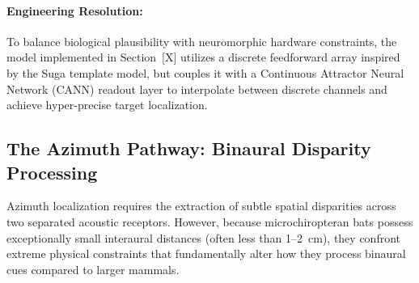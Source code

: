 \paragraph{Engineering Resolution:} To balance biological plausibility with neuromorphic hardware constraints, the model implemented in Section~[X] utilizes a discrete feedforward array inspired by the Suga template model, but couples it with a Continuous Attractor Neural Network (CANN) readout layer to interpolate between discrete channels and achieve hyper-precise target localization.


\subsection{The Azimuth Pathway: Binaural Disparity Processing}
\label{sec:azimuth_pathway}
Azimuth localization requires the extraction of subtle spatial disparities across two separated acoustic receptors. However, because microchiropteran bats possess exceptionally small interaural distances (often less than 1--2~cm), they confront extreme physical constraints that fundamentally alter how they process binaural cues compared to larger mammals.

